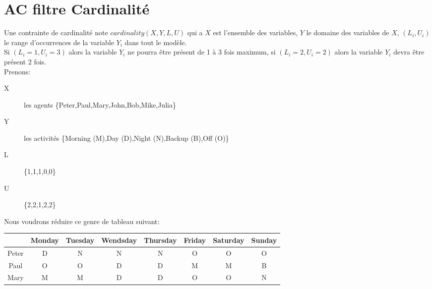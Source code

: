 \section{AC filtre Cardinalité}

Une contrainte de cardinalité note $cardinality(X,Y,L,U)$ qui a $X$ est l'ensemble des variables, $Y$ le domaine des variables de $X$, $(L_i,U_i)$ le range d'occurrences de la variable $Y_i$ dans tout le modèle.\\
Si $(L_i=1,U_i=3)$ alors la variable $Y_i$ ne pourra être présent de 1 à 3 fois maximum, si $(L_i=2,U_i=2)$ alors la variable $Y_i$ devra être présent 2 fois.\\

Prenons:
\begin{description}
\item[X] les agents \{Peter,Paul,Mary,John,Bob,Mike,Julia\}
\item[Y] les activités \{Morning (M),Day (D),Night (N),Backup (B),Off (O)\}
\item[L] \{1,1,1,0,0\}
\item[U] \{2,2,1,2,2\}
\end{description}

Nous voudrons réduire ce genre de tableau suivant:\\
\begin{tabular}{c|ccccccc}
$ $&Monday&Tuesday&Wendsday&Thursday&Friday&Saturday&Sunday\\ \hline
Peter&D&N&N&N&O&O&O\\
Paul&O&O&D&D&M&M&B\\
Mary&M&M&D&D&O&O&N\\
\end{tabular}

